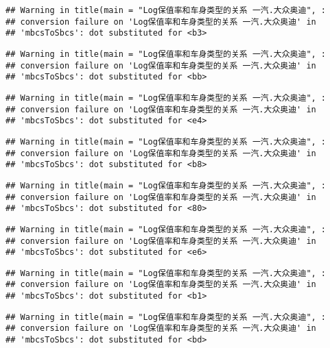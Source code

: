 \documentclass[]{article}
\begin{document}
\begin{verbatim}
## Warning in title(main = "Log保值率和车身类型的关系 一汽.大众奥迪", :
## conversion failure on 'Log保值率和车身类型的关系 一汽.大众奥迪' in
## 'mbcsToSbcs': dot substituted for <b3>
\end{verbatim}

\begin{verbatim}
## Warning in title(main = "Log保值率和车身类型的关系 一汽.大众奥迪", :
## conversion failure on 'Log保值率和车身类型的关系 一汽.大众奥迪' in
## 'mbcsToSbcs': dot substituted for <bb>
\end{verbatim}

\begin{verbatim}
## Warning in title(main = "Log保值率和车身类型的关系 一汽.大众奥迪", :
## conversion failure on 'Log保值率和车身类型的关系 一汽.大众奥迪' in
## 'mbcsToSbcs': dot substituted for <e4>
\end{verbatim}

\begin{verbatim}
## Warning in title(main = "Log保值率和车身类型的关系 一汽.大众奥迪", :
## conversion failure on 'Log保值率和车身类型的关系 一汽.大众奥迪' in
## 'mbcsToSbcs': dot substituted for <b8>
\end{verbatim}

\begin{verbatim}
## Warning in title(main = "Log保值率和车身类型的关系 一汽.大众奥迪", :
## conversion failure on 'Log保值率和车身类型的关系 一汽.大众奥迪' in
## 'mbcsToSbcs': dot substituted for <80>
\end{verbatim}

\begin{verbatim}
## Warning in title(main = "Log保值率和车身类型的关系 一汽.大众奥迪", :
## conversion failure on 'Log保值率和车身类型的关系 一汽.大众奥迪' in
## 'mbcsToSbcs': dot substituted for <e6>
\end{verbatim}

\begin{verbatim}
## Warning in title(main = "Log保值率和车身类型的关系 一汽.大众奥迪", :
## conversion failure on 'Log保值率和车身类型的关系 一汽.大众奥迪' in
## 'mbcsToSbcs': dot substituted for <b1>
\end{verbatim}

\begin{verbatim}
## Warning in title(main = "Log保值率和车身类型的关系 一汽.大众奥迪", :
## conversion failure on 'Log保值率和车身类型的关系 一汽.大众奥迪' in
## 'mbcsToSbcs': dot substituted for <bd>
\end{verbatim}
\end{document}
